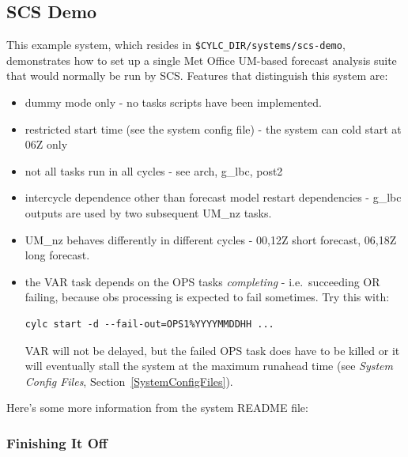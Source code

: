 \documentclass[11pt,a4paper]{article}
\begin{document}
\pagebreak
\subsection{SCS Demo}

This example system, which resides in 
\lstinline=$CYLC_DIR/systems/scs-demo=,
demonstrates how to set up a single Met Office
UM-based forecast analysis suite that would normally be run by SCS.
Features that distinguish this system are:

\begin{itemize}

    \item dummy mode only - no tasks scripts have been implemented.

    \item restricted start time (see the system config file) - the
        system can cold start at 06Z only

    \item not all tasks run in all cycles - see arch, g\_lbc, post2

    \item intercycle dependence other than forecast model restart 
        dependencies - g\_lbc outputs are used by two subsequent UM\_nz
        tasks.

    \item UM\_nz behaves differently in different cycles - 00,12Z short
        forecast, 06,18Z long forecast.

    \item the VAR task depends on the OPS tasks {\em completing} - i.e.\
        succeeding OR failing, because obs processing is expected to
        fail sometimes.  Try this with:

        \begin{lstlisting}
cylc start -d --fail-out=OPS1%YYYYMMDDHH ...
        \end{lstlisting}

        VAR will not be delayed, but the failed OPS task does have to be
        killed or it will eventually stall the system at the maximum
        runahead time (see {\em System Config Files},
        Section~\ref{SystemConfigFiles}).
        
\end{itemize}

Here's some more information from the system README file:

\lstset{language=}


\subsubsection{Finishing It Off}
\end{document}
